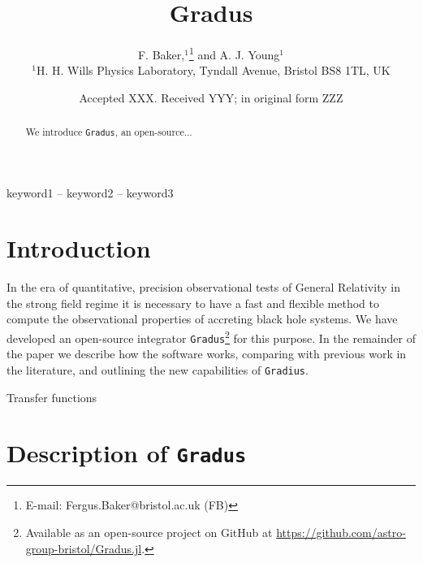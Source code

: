 \documentclass[fleqn,usenatbib]{mnras}
\title[Gradus]{Gradus}
\author[F. Baker et al.]{
F. Baker,$^{1}$\thanks{E-mail: Fergus.Baker@bristol.ac.uk (FB)}
and A. J. Young$^{1}$
\\
$^{1}$H. H. Wills Physics Laboratory, Tyndall Avenue, Bristol BS8 1TL, UK
}
\date{Accepted XXX. Received YYY; in original form ZZZ}
\begin{document}
\label{firstpage}
\pagerange{\pageref{firstpage}--\pageref{lastpage}}
\maketitle

\begin{abstract}
	We introduce {\tt Gradus}, an open-source...
\end{abstract}

\begin{keywords}
keyword1 -- keyword2 -- keyword3
\end{keywords}



\section{Introduction}

In the era of quantitative, precision observational tests of General Relativity in the strong field regime it is necessary to have a fast and flexible method to compute the observational properties of accreting black hole systems. We have developed an open-source integrator 
{\tt Gradus}\footnote{Available as an open-source project on GitHub at \url{https://github.com/astro-group-bristol/Gradus.jl}.} for this purpose. In the remainder of the paper we describe how the software works, comparing with previous work in the literature, and outlining the new capabilities of {\tt Gradius}. %

Transfer functions \citep{cunningham_effects_1975} %

\section{Description of {\tt Gradus}} %

\end{document}
